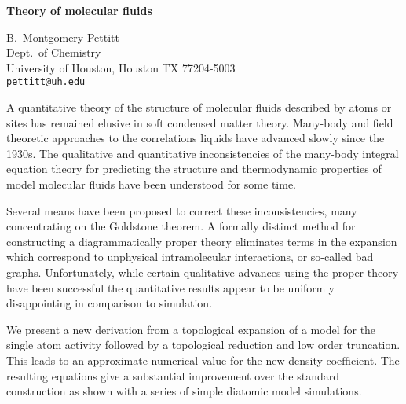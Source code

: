 \documentclass{report}
\begin{document}

\begin{center}
{\large
{\bf Theory of molecular fluids}}

	B.~Montgomery Pettitt \\
	Dept.~of Chemistry \\
	University of Houston, Houston TX 77204-5003 \\
	{\tt pettitt@uh.edu} \\
\end{center}
A quantitative theory of the structure of molecular fluids
described by atoms or sites has remained elusive in soft
condensed matter theory. Many-body and field theoretic
approaches to the correlations liquids have advanced slowly
since the 1930s. The qualitative and quantitative
inconsistencies of the many-body integral equation theory
for predicting the structure and thermodynamic properties of
model molecular fluids have been understood for some time.

Several means have been proposed to correct these
inconsistencies, many concentrating on the Goldstone
theorem. A formally distinct method for constructing a
diagrammatically proper theory eliminates terms in the
expansion which correspond to unphysical intramolecular
interactions, or so-called bad graphs. Unfortunately, while
certain qualitative advances using the proper theory have
been successful the quantitative results appear to be
uniformly disappointing in comparison to simulation.

We present a new derivation from a topological expansion of
a model for the single atom activity followed by a
topological reduction and low order truncation. This leads
to an approximate numerical value for the new density
coefficient.  The resulting equations give a substantial
improvement over the standard construction as shown with
a series of simple diatomic model simulations.



\end{document}
